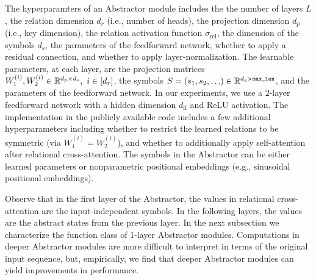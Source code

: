 The hyperparamters of an Abstractor module includes the the number of layers $L$, the relation dimension $d_r$ (i.e., number of heads),  the projection dimension $d_p$ (i.e., key dimension), the relation activation function $\sigma_{\mathrm{rel}}$, the dimension of the symbols $d_s$, the parameters of the feedforward network, whether to apply a residual connection, and whether to apply layer-normalization. The learnable parameters, at each layer, are the projection matrices $W_1^{(i)}, W_2^{(i)} \in \reals^{d_p \times d_s}, \ i \in [d_r]$, the symbols $S = \left(s_1, s_2, \ldots \right) \in \mathbb{R}^{d_s \times \texttt{max\_len}}$, and the parameters of the feedforward network. In our experiments, we use a 2-layer feedforward network with a hidden dimension $d_{\mathrm{ff}}$ and ReLU activation. The implementation in the publicly available code includes a few additional hyperparameters including whether to restrict the learned relations to be symmetric (via $W_1^{(i)} = W_2^{(i)}$), and whether to additionally apply self-attention after relational cross-attention. The symbols in the Abstractor can be either learned parameters or nonparametric positional embeddings (e.g., sinusoidal positional embeddings).

Observe that in the first layer of the Abstractor, the values in relational cross-attention are the input-independent symbols. In the following layers, the values are the abstract states from the previous layer. In the next subsection we characterize the function class of 1-layer Abstractor modules. Computations in deeper Abstractor modules are more difficult to interpret in terms of the original input sequence, but, empirically, we find that deeper Abstractor modules can yield improvements in performance.

